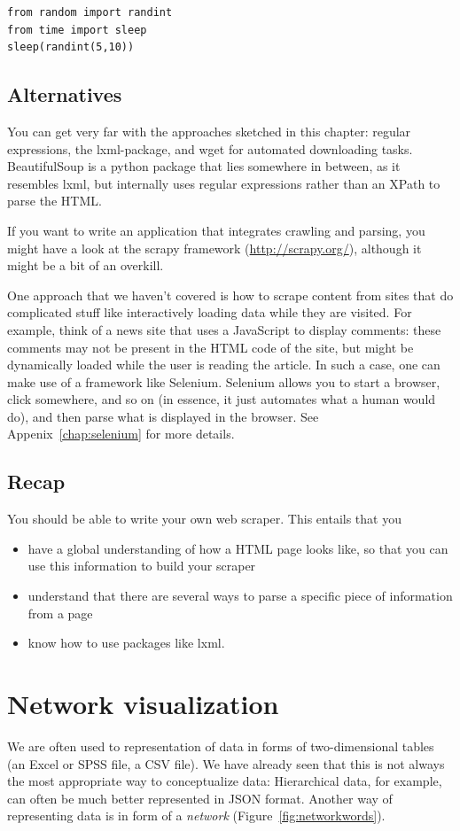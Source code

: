 \documentclass[a4paper,12pt]{book}
\begin{document}
\begin{lstlisting}
from random import randint
from time import sleep
sleep(randint(5,10))
\end{lstlisting}


\section{Alternatives}
You can get very far with the approaches sketched in this chapter: regular expressions, the lxml-package, and wget for automated downloading tasks. BeautifulSoup is a python package that lies somewhere in between, as it resembles lxml, but internally uses regular expressions rather than an XPath to parse the HTML.

If you want to write an application that integrates crawling and parsing, you might have a look at the scrapy framework (\url{http://scrapy.org/}), although it might be a bit of an overkill.

One approach that we haven't covered is how to scrape content from sites that do complicated stuff like interactively loading data while they are visited. For example, think of a news site that uses a JavaScript to display comments: these comments may not be present in the HTML code of the site, but might be dynamically loaded while the user is reading the article. In such a case, one can make use of a framework like Selenium. Selenium allows you to start a browser, click somewhere, and so on (in essence, it just automates what a human would do), and then parse what is displayed in the browser. See Appenix~\ref{chap:selenium} for more details.

\section{Recap}
You should be able to write your own web scraper. This entails that you
\begin{itemize}
	\item have a global understanding of how a HTML page looks like, so that you can use this information to build your scraper
	\item understand that there are several ways to parse a specific piece of information from a page
	\item know how to use packages like lxml.
\end{itemize}



\chapter{Network visualization}
We are often used to representation of data in forms of two-dimensional tables (an Excel or SPSS file, a CSV file). We have already seen that this is not always the most appropriate way to conceptualize data: Hierarchical data, for example, can often be much better represented in JSON format. Another way of representing data is in form of a \emph{network} (Figure~\ref{fig:networkwords}).
\end{document}
